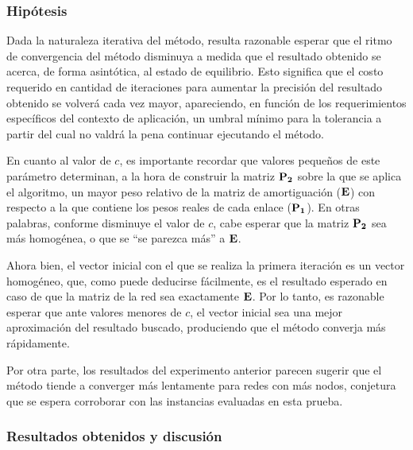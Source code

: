            \subsubsection*{Hipótesis}
            Dada la naturaleza iterativa del método, resulta razonable esperar que el ritmo de convergencia del método disminuya a medida que el resultado obtenido se acerca, de forma asintótica, al estado de equilibrio. Esto significa que el costo requerido en cantidad de iteraciones para aumentar la precisión del resultado obtenido se volverá cada vez mayor, apareciendo, en función de los requerimientos específicos del contexto de aplicación, un umbral mínimo para la tolerancia a partir del cual no valdrá la pena continuar ejecutando el método.

            En cuanto al valor de $c$, es importante recordar que valores pequeños de este parámetro determinan, a la hora de construir la matriz $\mathbf{P_2}$ sobre la que se aplica el algoritmo, un mayor peso relativo de la matriz de amortiguación ($\mathbf{E}$) con respecto a la que contiene los pesos reales de cada enlace ($\mathbf{P_1}$). En otras palabras, conforme disminuye el valor de $c$, cabe esperar que la matriz $\mathbf{P_2}$ sea más homogénea, o que se “se parezca más” a $\mathbf{E}$.

            Ahora bien, el vector inicial con el que se realiza la primera iteración es un vector homogéneo, que, como puede deducirse fácilmente, es el resultado esperado en caso de que la matriz de la red sea exactamente $\mathbf{E}$. Por lo tanto, es razonable esperar que ante valores menores de $c$, el vector inicial sea una mejor aproximación del resultado buscado, produciendo que el método converja más rápidamente.

            Por otra parte, los resultados del experimento anterior parecen sugerir que el método tiende a converger más lentamente para redes con más nodos, conjetura que se espera corroborar con las instancias evaluadas en esta prueba. 

            \subsubsection*{Resultados obtenidos y discusión}

